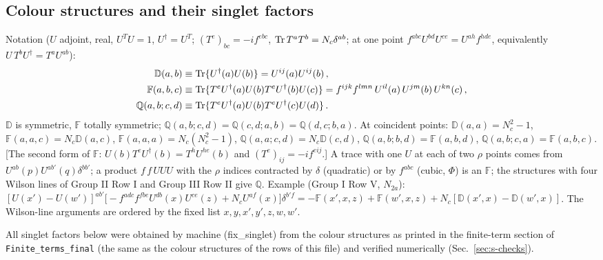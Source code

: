 \documentclass[9pt]{article}
\def\mf#1{\mathbb{#1}}
\numberwithin{equation}{section}
\begin{document}
{\subsection{Colour structures and their singlet factors}
\noindent Notation ($U$ adjoint, real, $U^{T}U=1$, $U^{\dagger}=U^{T}$; $(T^{e})_{bc}=-if^{ebc}$, ${\rm Tr}\,T^{a}T^{b}=N_{c}\delta^{ab}$; at one point $f^{abc}U^{bd}U^{ce}=U^{ah}f^{hde}$, equivalently $U\,T^{b}U^{\dagger}=T^{a}U^{ab}$):
\begin{align}
\mf{D}(a,b)&\equiv{\rm Tr}\{U^{\dagger}(a)U(b)\}=U^{ij}(a)U^{ij}(b)\,,\notag\\
\mf{F}(a,b,c)&\equiv{\rm Tr}\{T^{e}U^{\dagger}(a)U(b)T^{e}U^{\dagger}(b)U(c)\}=f^{ijk}f^{lmn}\,U^{il}(a)\,U^{jm}(b)\,U^{kn}(c)\,,\notag\\
\mf{Q}(a,b;c,d)&\equiv{\rm Tr}\{T^{e}U^{\dagger}(a)U(b)T^{e}U^{\dagger}(c)U(d)\}\,.\notag
\end{align}
$\mf{D}$ is symmetric, $\mf{F}$ totally symmetric; $\mf{Q}(a,b;c,d)=\mf{Q}(c,d;a,b)=\mf{Q}(d,c;b,a)$. At coincident points: $\mf{D}(a,a)=N_{c}^{2}-1$, $\mf{F}(a,a,c)=N_{c}\mf{D}(a,c)$, $\mf{F}(a,a,a)=N_{c}(N_{c}^{2}-1)$, $\mf{Q}(a,a;c,d)=N_{c}\mf{D}(c,d)$, $\mf{Q}(a,b;b,d)=\mf{F}(a,b,d)$, $\mf{Q}(a,b;c,a)=\mf{F}(a,b,c)$. [The second form of $\mf{F}$: $U(b)T^{e}U^{\dagger}(b)=T^{h}U^{he}(b)$ and $(T^{e})_{ij}=-if^{eij}$.] A trace with one $U$ at each of two $\rho$ points comes from $U^{ab}(p)U^{ab'}(q)\delta^{bb'}$; a product $f\,f\,UUU$ with the $\rho$ indices contracted by $\delta$ (quadratic) or by $f^{abc}$ (cubic, $\Phi$) is an $\mf{F}$; the structures with four Wilson lines of Group II Row I and Group III Row II give $\mf{Q}$. Example (Group I Row V, $N_{2a}$): $[U(x')-U(w')]^{ab'}\big[-f^{adc}f^{fbe}U^{db}(x)U^{ce}(z)+N_{c}U^{af}(x)\big]\delta^{b'f}=-\mf{F}(x',x,z)+\mf{F}(w',x,z)+N_{c}[\mf{D}(x',x)-\mf{D}(w',x)]$. The Wilson-line arguments are ordered by the fixed list $x,y,x',y',z,w,w'$.

\noindent All singlet factors below were obtained by machine (fix\_singlet) from the colour structures as printed in the finite-term section of \texttt{Finite\_terms\_final} (the same as the colour structures of the rows of this file) and verified numerically (Sec.~\ref{sec:s-checks}).

}
\end{document}
